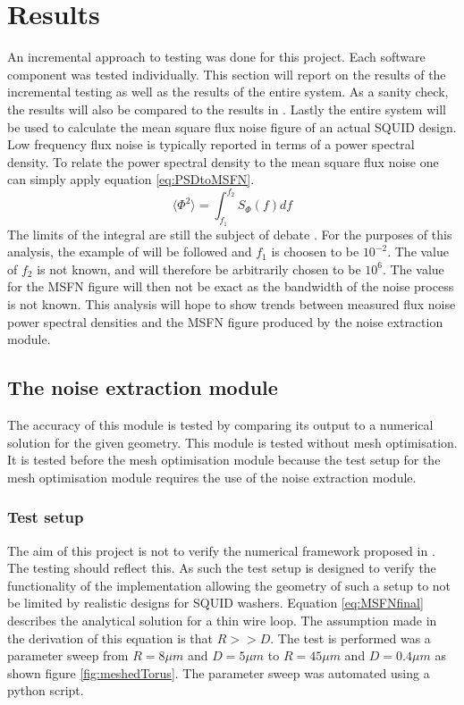 \graphicspath{{results/fig/}}

\chapter{Results}
\label{chap:results}
An incremental approach to testing was done for this project. Each software component was tested individually. This section will report on the results of the incremental testing as well as the results of the entire system. As a sanity check, the results will also be compared to the results in \cite{fluxNoiseSquidsStevenAnton}. Lastly the entire system will be used to calculate the mean square flux noise figure of an actual SQUID design. Low frequency flux noise is typically reported in terms of a power spectral density. To relate the power spectral density to the mean square flux noise one can simply apply equation \ref{eq:PSDtoMSFN}.
\begin{equation}
    \langle \Phi^2 \rangle = \int_{f_1}^{f_2}S_\Phi (f) df
    \label{eq:PSDtoMSFN}
\end{equation} 
The limits of the integral are still the subject of debate \cite{fluxNoiseSquidsStevenAnton}. For the purposes of this analysis, the example of \cite{fluxNoiseSquidsStevenAnton} will be followed and $f_1$ is choosen to be $10^{-2}$. The value of $f_2$ is not known, and will therefore be arbitrarily chosen to be $10^6$. The value for the MSFN figure will then not be exact as the bandwidth of the noise process is not known. This analysis will hope to show trends between measured flux noise power spectral densities and the MSFN figure produced by the noise extraction module.
\section{The noise extraction module}
The accuracy of this module is tested by comparing its output to a numerical solution for the given geometry. This module is tested without mesh optimisation. It is tested before the mesh optimisation module because the test setup for the mesh optimisation module requires the use of the noise extraction module.
\subsection{Test setup}
The aim of this project is not to verify the numerical framework proposed in \cite{fluxNoiseSquidsStevenAnton}. The testing should reflect this. As such the test setup is designed to verify the functionality of the implementation allowing the geometry of such a setup to not be limited by realistic designs for SQUID washers. Equation \ref{eq:MSFNfinal} describes the analytical solution for a thin wire loop. The assumption made in the derivation of this equation is that $R >> D$. The test is performed was a parameter sweep from $R = \si{8}{\mu m}$ and $D = \si{5}{\mu m}$ to $R = \si{45}{\mu m}$ and $D = \si{0.4}{\mu m}$ as shown figure \ref{fig:meshedTorus}. The parameter sweep was automated using a python script.

